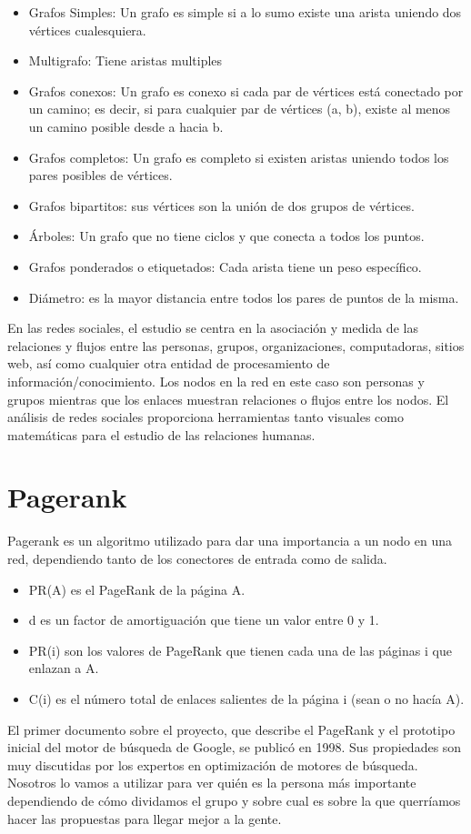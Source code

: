 \begin{itemize}
    \item Grafos Simples: Un grafo es simple si a lo sumo existe una arista uniendo dos vértices cualesquiera.
    \item Multigrafo: Tiene aristas multiples
    \item Grafos conexos: Un grafo es conexo si cada par de vértices está conectado por un camino; es decir, si para cualquier par de vértices (a, b), existe al menos un camino posible desde a hacia b.
    \item Grafos completos: Un grafo es completo si existen aristas uniendo todos los pares posibles de vértices.
    \item Grafos bipartitos: sus vértices son la unión de dos grupos de vértices.
    \item Árboles: Un grafo que no tiene ciclos y que conecta a todos los puntos.
    \item Grafos ponderados o etiquetados: Cada arista tiene un peso específico.
    \item Diámetro: es la mayor distancia entre todos los pares de puntos de la misma.
\end{itemize} 
En las redes sociales, el estudio se centra en la asociación y medida de las relaciones y flujos entre las personas, grupos, organizaciones, computadoras, sitios web, así como cualquier otra entidad de procesamiento de información/conocimiento. Los nodos en la red en este caso son personas y grupos mientras que los enlaces muestran relaciones o flujos entre los nodos. El análisis de redes sociales proporciona herramientas tanto visuales como matemáticas para el estudio de las relaciones humanas.

\section{Pagerank} 
Pagerank es un algoritmo utilizado para dar una importancia a un nodo en una red, dependiendo tanto de los conectores de entrada como de salida.
\begin{itemize}
    \item PR(A) es el PageRank de la página A.
    \item d es un factor de amortiguación que tiene un valor entre 0 y 1.
    \item PR(i) son los valores de PageRank que tienen cada una de las páginas i que enlazan a A.
    \item C(i) es el número total de enlaces salientes de la página i (sean o no hacía A).
\end{itemize}
El primer documento sobre el proyecto, que describe el PageRank y el prototipo inicial del motor de búsqueda de Google, se publicó en 1998. Sus propiedades son muy discutidas por los expertos en optimización de motores de búsqueda. \cite{wiki:pagerank}
Nosotros lo vamos a utilizar para ver quién es la persona más importante dependiendo de cómo dividamos el grupo y sobre cual es sobre la que querríamos hacer las propuestas para llegar mejor a la gente.

